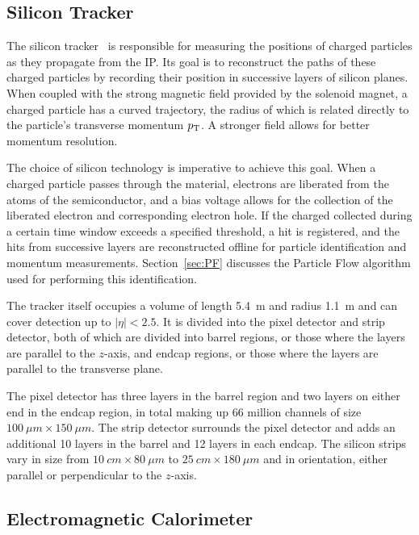\subsection{Silicon Tracker\label{subsec:tracker}}

The silicon tracker~\cite{Karimaki:368412} is responsible for measuring the positions of charged particles as they propagate from the IP.
Its goal is to reconstruct the paths of these charged particles by recording their position
in successive layers of silicon planes.
When coupled with the strong magnetic field provided by the solenoid
magnet, a charged particle has a curved trajectory, the radius of which is related directly
to the particle's transverse momentum $p_{\rm T}$. A stronger field allows for
better momentum resolution.

The choice of silicon technology is imperative to achieve this goal. When a charged particle passes through the material, electrons are liberated from the atoms of the semiconductor, and a bias voltage
allows for the collection of the liberated electron and corresponding electron hole.
If the charged collected during
a certain time window exceeds a specified threshold, a hit is registered, and the hits from successive layers
are reconstructed offline for particle identification and momentum measurements.
Section~\ref{sec:PF} discusses the Particle Flow algorithm used for performing this identification.

The tracker itself occupies a volume
of length 5.4~m and radius 1.1~m and can cover detection up to $|\eta| < 2.5$. It is divided into
the pixel detector and strip detector, both of which are divided into barrel regions, or those
where the layers are parallel to the $z$-axis, and endcap regions, or those where the layers
are parallel to the transverse plane.

The pixel detector has three layers in the barrel region
and two layers on either end in the endcap region, in total making up 66 million channels of size
$100~\mu m \times 150~\mu m$. The strip detector surrounds the pixel detector and adds an additional
10 layers in the barrel and 12 layers in each endcap. The silicon strips vary in size from
$10~cm \times 80~\mu m$ to $25~cm \times 180~\mu m$ and in orientation, either parallel or perpendicular
to the $z$-axis.

\subsection{Electromagnetic Calorimeter\label{subsec:ecal}}

